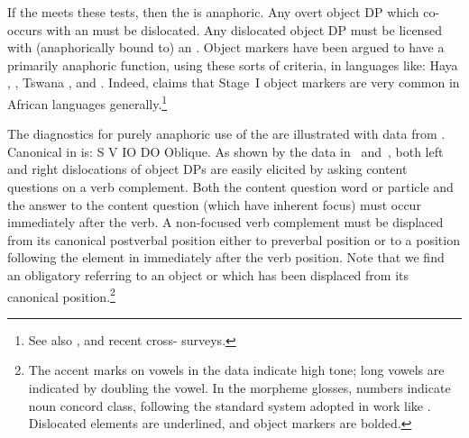 \documentclass[output=paper]{LSP/langsci}
\begin{document}
If the  meets these tests, then the  is anaphoric. 
Any overt object DP which co-occurs with an  must be dislocated. 
Any dislocated object DP must be licensed with (anaphorically bound to) an . 
Object markers have been argued to have a primarily anaphoric function, using these sorts of criteria, in  languages like: Haya \citep{Byarushengoetal1977Haya},  \citep{Zerbian2006Expression}, Tswana \citep{Creissels2006Typology},  \citep{Buell2005Issues,Chengetal2009Zulu,Schadeberg1995Object,vanderSpuy1993Dislocated,Zeller2012Object} and  \citep{Martenetal2012Object}. 
Indeed,  claims that Stage~I object markers are very common in African languages generally.\footnote{See also ,  and 
 recent cross- surveys.} 
 
The diagnostics for purely anaphoric use of the  are illustrated with data from  \citep{Chengetal2009Zulu}. 
Canonical  in  is: S V IO DO Oblique. 
As shown by the  data in~ and~, both left and right dislocations of object DPs are easily elicited by asking content questions on a verb complement. 
Both the content question word or particle and the answer to the content question (which have inherent focus) must occur immediately after the verb. 
A non-focused verb complement must be displaced from its canonical postverbal position either to preverbal position or to a position following the element in   immediately after the verb position. 
Note that we find an obligatory  referring to an object or  which has been displaced from its canonical position.\footnote{The accent marks on vowels in the data indicate high tone; long vowels are indicated by doubling the vowel. 
In the morpheme glosses, numbers indicate noun concord class, following the standard  system adopted in work like \citet{Mchombo2004Syntax}. 
Dislocated elements are underlined, and object markers are bolded.}

\end{document}

